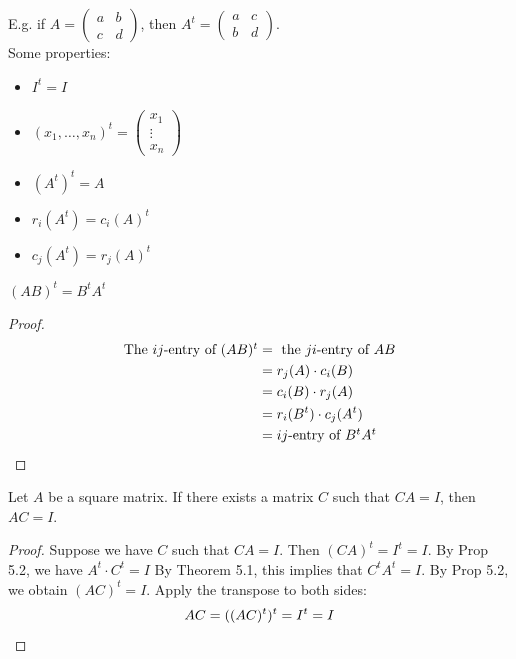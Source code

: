 \documentclass[10pt]{scrartcl}
\begin{document}
E.g. if $A = \begin{pmatrix}
a & b \\ c& d	
\end{pmatrix}$, then $A^t = \begin{pmatrix}
a & c \\ b& d	
\end{pmatrix}$.\\

Some properties: 
\begin{itemize}
\item $I^t= I$
\item $(x_1,\dots,x_n)^t = \begin{pmatrix}
 x_1\\\vdots\\x_n	
 \end{pmatrix}
$
\item $(A^t)^t = A$
\item $r_i(A^t) = c_i(A)^t$
\item $c_j(A^t) = r_j(A)^t$	
\end{itemize}\vsp


\begin{proposition}
$(AB)^t = B^tA^t$	
\end{proposition}
\begin{proof}
\begin{align*}
  \mbox{The $ij$-entry of $(AB)^t$} &= 
  \mbox{ the $ji$-entry of $AB$}\\
  &= r_j(A) \cdot c_i(B)\\
  &= c_i(B)\cdot r_j(A)\\
  &= r_i(B^t)\cdot c_j(A^t)\\
  &= \mbox{$ij$-entry of $B^tA^t$}\qedhere
\end{align*}
\end{proof}\vsp

\begin{corollary}
Let $A$ be a square matrix. If there exists a matrix $C$ such that $CA = I$, then $AC = I$. 	
\end{corollary}

\begin{proof}
Suppose we have $C$ such that $CA = I$. Then $(CA)^t = I^t = I$. By Prop 5.2, we have $A^t \cdot C^t = I$ By Theorem 5.1, this implies that $C^tA^t = I$. By Prop 5.2, we obtain $(AC)^t = I$. Apply the transpose to both sides:
\[
  AC = ((AC)^t)^t = I^t = I\qedhere
\]
\end{proof}
\end{document}
